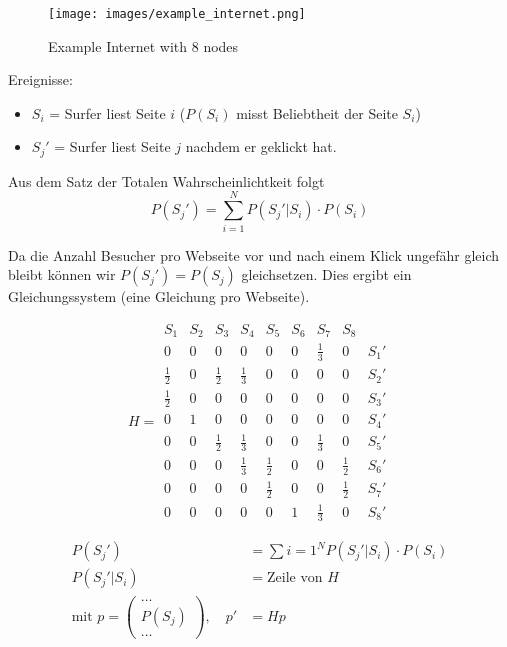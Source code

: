 \documentclass[10pt,a4paper]{scrartcl}
\begin{document}
\begin{figure}
    \centering
    \texttt{[image: images/example\_internet.png]}
    \caption{Example Internet with 8 nodes}
    \label{fig:awesome_image}
\end{figure}

Ereignisse:
\begin{itemize}
\item $S_{i}$ = Surfer liest Seite $i$ ($P(S_i)$ misst Beliebtheit der Seite $S_i$)
\item $S_{j}'$ = Surfer liest Seite $j$ nachdem er geklickt hat.
\end{itemize}

Aus dem Satz der Totalen Wahrscheinlichtkeit folgt
$$P(S_j') = \sum_{i=1}^N P(S_j' | S_i) \cdot P(S_i)$$

Da die Anzahl Besucher pro Webseite vor und nach einem Klick ungefähr gleich bleibt können wir $P(S_j') = P(S_j)$ gleichsetzen. Dies ergibt ein Gleichungssystem (eine Gleichung pro Webseite).

$$H = 
\begin{matrix}
  S_1 & S_2 & S_3 & S_4 & S_5 & S_6 & S_7 & S_8 &  \\
  0 & 0 & 0 & 0 & 0 & 0 & \frac{1}{3} & 0 & S_1' \\
  \frac{1}{2} & 0 & \frac{1}{2} & \frac{1}{3} & 0 & 0 & 0 & 0 & S_2' \\
  \frac{1}{2} & 0 & 0 & 0 & 0 & 0 & 0 & 0 & S_3' \\
  0 & 1 & 0 & 0 & 0 & 0 & 0 & 0 & S_4' \\
  0 & 0 & \frac{1}{2} & \frac{1}{3} & 0 & 0 & \frac{1}{3} & 0 & S_5' \\
  0 & 0 & 0 & \frac{1}{3} & \frac{1}{2} & 0 & 0 & \frac{1}{2} & S_6' \\
  0 & 0 & 0 & 0 & \frac{1}{2} & 0 & 0 & \frac{1}{2} & S_7' \\
  0 & 0 & 0 & 0 & 0 & 1 & \frac{1}{3} & 0 & S_8' 
\end{matrix}$$

\begin{align*}
P(S_{j}') &= \sum\limits{i=1}^N P(S_{j}'|S_{i}) \cdot P(S_{i}) \\
P(S_{j}'|S_{i}) &= \mbox{Zeile von } H \\
\mbox{mit } p = \begin{pmatrix}
\dots \\
P(S_{j}) \\
\dots
\end{pmatrix},\quad p' &= Hp
\end{align*}
\end{document}
